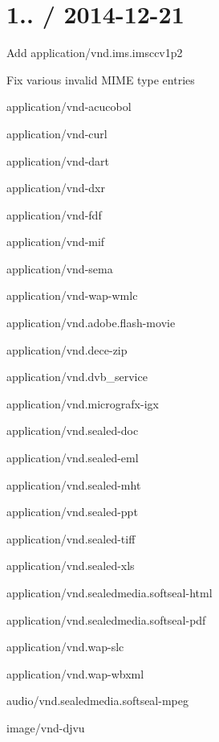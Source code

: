 \section*{1.. / 2014-\/12-\/21 }


\begin{DoxyItemize}
\item Add {\ttfamily application/vnd.\+ims.\+imsccv1p2}
\item Fix various invalid M\+I\+ME type entries
\begin{DoxyItemize}
\item {\ttfamily application/vnd-\/acucobol}
\item {\ttfamily application/vnd-\/curl}
\item {\ttfamily application/vnd-\/dart}
\item {\ttfamily application/vnd-\/dxr}
\item {\ttfamily application/vnd-\/fdf}
\item {\ttfamily application/vnd-\/mif}
\item {\ttfamily application/vnd-\/sema}
\item {\ttfamily application/vnd-\/wap-\/wmlc}
\item {\ttfamily application/vnd.\+adobe.\+flash-\/movie}
\item {\ttfamily application/vnd.\+dece-\/zip}
\item {\ttfamily application/vnd.\+dvb\+\_\+service}
\item {\ttfamily application/vnd.\+micrografx-\/igx}
\item {\ttfamily application/vnd.\+sealed-\/doc}
\item {\ttfamily application/vnd.\+sealed-\/eml}
\item {\ttfamily application/vnd.\+sealed-\/mht}
\item {\ttfamily application/vnd.\+sealed-\/ppt}
\item {\ttfamily application/vnd.\+sealed-\/tiff}
\item {\ttfamily application/vnd.\+sealed-\/xls}
\item {\ttfamily application/vnd.\+sealedmedia.\+softseal-\/html}
\item {\ttfamily application/vnd.\+sealedmedia.\+softseal-\/pdf}
\item {\ttfamily application/vnd.\+wap-\/slc}
\item {\ttfamily application/vnd.\+wap-\/wbxml}
\item {\ttfamily audio/vnd.\+sealedmedia.\+softseal-\/mpeg}
\item {\ttfamily image/vnd-\/djvu}

\end{DoxyItemize}
\end{DoxyItemize}
